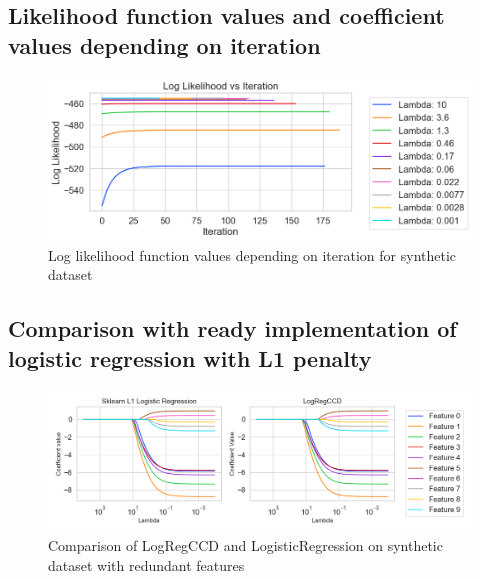 \documentclass[12pt]{article}
\begin{document}
\subsection{Likelihood function values and coefficient values depending on iteration}


\begin{figure}
    \centering
  \includegraphics[width=\textwidth]{../results/log_likelihood_synthetic_dataset.png}
    \caption{Log likelihood function values depending on iteration for synthetic dataset}
    \label{fig:log-likelihood-synthetic-dataset}
\end{figure}

\subsection{Comparison with ready implementation of logistic regression with L1 penalty}


\begin{figure}[h]
    \centering
  \includegraphics[width=\textwidth]{../results/logistic_regression_l1_logregccd_coefficients_redundant_features.png}
    \caption{Comparison of LogRegCCD and LogisticRegression on synthetic dataset with redundant features}
    \label{fig:comparison-synthetic-dataset-redundant-features}
  \end{figure}


\clearpage 
\listoffigures
\listoftables
\printbibliography
\end{document}
